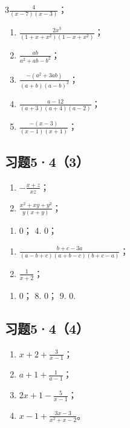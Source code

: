 3\(\frac{4}{(x - 7)(x - 3)}\)；

\begin{enumerate}[start=4]
\item
  \(\frac{2x^3}{(1 + x + x^2)(1 - x + x^2)}\)；
\item
  \(\frac{ab}{a^2 + ab - b^2}\)；
\item
  \(\frac{-(a^2 + 3ab)}{(a + b)(a - b)^2}\)；
\item
  \(\frac{a - 12}{(a + 3)(a + 4)(a - 2)}\)；
\item
  \(\frac{-(x - 3)}{(x - 1)(x + 1)}\)；
\end{enumerate}

\subsection{习题5·4（3）}

\begin{enumerate}[start=1]
\item
  \(-\frac{x + z}{xz}\)；
\item
  \(\frac{x^2 + xy + y^2}{y(x + y)}\)；
\end{enumerate}

\begin{enumerate}[start=3]
\item
  0； 4. 0；
\end{enumerate}

\begin{enumerate}[start=5]
\item
  \(\frac{b + c - 3a}{(a - b + c)(a + b - c)(b + c - a)}\)；
\item
  \(\frac{1}{x + 2}\)；
\end{enumerate}

\begin{enumerate}[start=7]
\item
  0； 8. 0； 9. 0.
\end{enumerate}

\subsection{习题5·4（4）}

\begin{enumerate}[start=9]
\item
  \(x + 2 + \frac{3}{x - 1}\)；
\item
  \(a + 1 + \frac{1}{a - 1}\)；
\item
  \(2x + 1 - \frac{5}{x - 1}\)；
\item
  \(x - 1 + \frac{3x - 3}{x^2 + x - 2}\)。
\end{enumerate}

